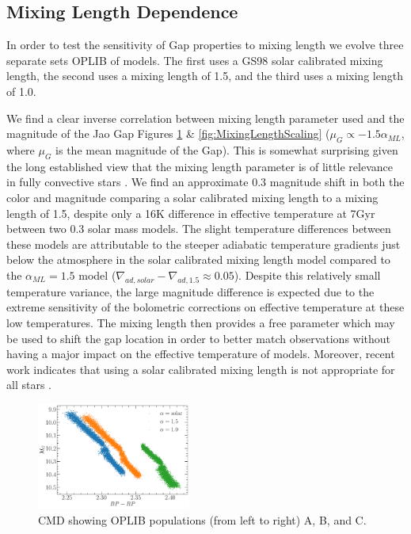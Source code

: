 \subsection{Mixing Length Dependence}
In order to test the sensitivity of Gap properties to mixing length we
evolve three separate sets OPLIB of models. The first uses a GS98
solar calibrated mixing length, the second uses a mixing length of
1.5, and the third uses a mixing length of 1.0.

We find a clear inverse correlation between mixing length parameter used and
the magnitude of the Jao Gap Figures \ref{fig:MixingLengthCMD} \&
\ref{fig:MixingLengthScaling} ($\mu_{G} \propto -1.5\alpha_{ML}$, where
$\mu_{G}$ is the mean magnitude of the Gap). This is somewhat surprising given
the long established view that the mixing length parameter is of little
relevance in fully convective stars \citep{Baraffe1997}. We find an approximate
0.3 magnitude shift in both the color and magnitude comparing a solar
calibrated mixing length to a mixing length of 1.5, despite only a 16K
difference in effective temperature at 7Gyr between two 0.3 solar mass models.
The slight temperature differences between these models are
attributable to the steeper adiabatic temperature gradients just below the
atmosphere in the solar calibrated mixing length model compared to the
$\alpha_{ML} = 1.5$ model ($\nabla_{ad,solar} - \nabla_{ad,1.5} \approx 0.05$).
Despite this relatively small temperature variance, the large magnitude
difference is expected due to the extreme sensitivity of the bolometric
corrections on effective temperature at these low temperatures. The
mixing length then provides a free parameter which may be used to shift the gap
location in order to better match observations without having a major impact on
the effective temperature of models. Moreover, recent work indicates that using
a solar calibrated mixing length is not appropriate for all stars
\citep[e.g.][]{Trampedach2014, Joyce2018}.

\begin{figure}
	\centering
	\includegraphics[width=0.45\textwidth]{./alphaMLComparisionCMD.pdf}
	\caption{CMD showing OPLIB populations (from left to right) A, B, and C.}
	\label{fig:MixingLengthCMD}
\end{figure}

